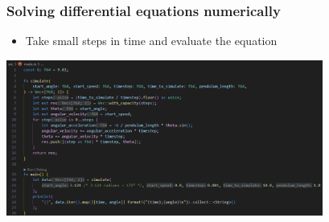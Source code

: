 \documentclass[aspectratio=169, t]{beamer}
\begin{document}
\begin{frame}[fragile]
	\frametitle{Solving differential equations numerically}
	\begin{itemize}
		\item Take small steps in time and evaluate the equation
	\end{itemize}

	\includegraphics[width=0.78\textwidth]{images/pendulum-raw-calculation-code.png}
\end{frame}
\end{document}
